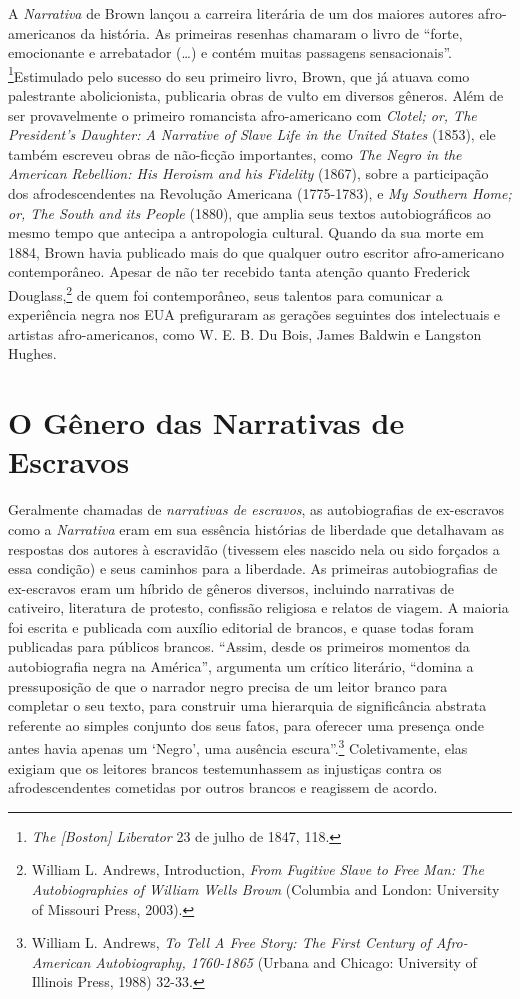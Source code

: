 A \emph{Narrativa} de Brown
lançou a carreira literária de um dos maiores autores afro-americanos da
história. As primeiras resenhas chamaram o livro de ``forte, emocionante
e arrebatador (\ldots{}) e contém muitas passagens sensacionais''.
\footnote{\emph{The {[}Boston{]} Liberator} 23 de julho de 1847, 118.}Estimulado
pelo sucesso do seu primeiro livro, Brown, que já atuava como
palestrante abolicionista, publicaria obras de vulto em diversos
gêneros. Além de ser provavelmente o primeiro romancista afro-americano
com \emph{Clotel; or, The President's Daughter: A Narrative of Slave
Life in the United States} (1853), ele também escreveu obras de
não-ficção importantes, como \emph{The Negro in the American Rebellion:
His Heroism and his Fidelity} (1867), sobre a participação dos
afrodescendentes na Revolução Americana (1775-1783), e \emph{My Southern
Home; or, The South and its People} (1880), que amplia seus textos
autobiográficos ao mesmo tempo que antecipa a antropologia cultural.
Quando da sua morte em 1884, Brown havia publicado mais do que qualquer
outro escritor afro-americano contemporâneo. Apesar de não ter recebido
tanta atenção quanto Frederick Douglass,\footnote{William L. Andrews,
  Introduction, \emph{From Fugitive Slave to Free Man: The
  Autobiographies of William Wells Brown} (Columbia and London:
  University of Missouri Press, 2003).} de quem foi contemporâneo, seus
talentos para comunicar a experiência negra nos EUA prefiguraram as
gerações seguintes dos intelectuais e artistas afro-americanos, como W.
E. B. Du Bois, James Baldwin e Langston Hughes.

\section{O Gênero das Narrativas de Escravos}

Geralmente chamadas de \emph{narrativas de escravos}, as autobiografias
de ex-escravos como a \emph{Narrativa} eram em sua essência histórias de
liberdade que detalhavam as respostas dos autores à escravidão (tivessem
eles nascido nela ou sido forçados a essa condição) e seus caminhos para
a liberdade. As primeiras autobiografias de ex-escravos eram um híbrido
de gêneros diversos, incluindo narrativas de cativeiro, literatura de
protesto, confissão religiosa e relatos de viagem. A maioria foi escrita
e publicada com auxílio editorial de brancos, e quase todas foram
publicadas para públicos brancos. ``Assim, desde os primeiros momentos
da autobiografia negra na América'', argumenta um crítico literário,
``domina a pressuposição de que o narrador negro precisa de um leitor
branco para completar o seu texto, para construir uma hierarquia de
significância abstrata referente ao simples conjunto dos seus fatos,
para oferecer uma presença onde antes havia apenas um `Negro', uma
ausência escura''.\footnote{William L. Andrews, \emph{To Tell A Free
  Story: The First Century of Afro-American Autobiography, 1760-1865}
  (Urbana and Chicago: University of Illinois Press, 1988) 32-33.}
Coletivamente, elas exigiam que os leitores brancos testemunhassem as
injustiças contra os afrodescendentes cometidas por outros brancos e
reagissem de acordo.

